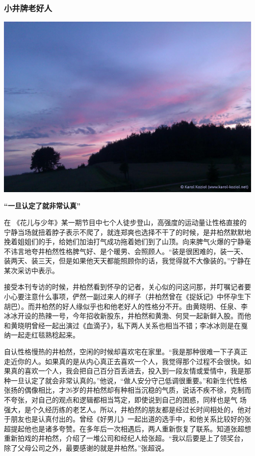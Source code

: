 \documentclass[12pt]{ctexart}
\begin{document}
\subsubsection*{小井牌老好人}
\rightboxbegin

\includegraphics[width=1\textwidth]{sky.jpg}

\rightboxend
\textbf{“一旦认定了就非常认真”}



在 《花儿与少年》某一期节目中七个人徒步登山，高强度的运动量让性格直接的宁静当场就扭着脖子表示不爬了，就连郑爽也选择不干了的时候，是井柏然默默地挽着姐姐们的手，给她们加油打气成功拖着她们到了山顶。向来脾气火爆的宁静毫不讳言地夸井柏然性格脾气好、是个暖男、会照顾人。“装是很困难的，装一天、装两天、装三天，但是如果他天天都能照顾你的话，我觉得就不大像装的。”宁静在某次采访中表示。

接受本刊专访的时候，井柏然看到怀孕的记者，关心似的问这问那，并叮嘱记者要小心要注意什么事项，俨然一副过来人的样子（井柏然曾在《捉妖记》中怀孕生下胡巴）。而井柏然的好人缘似乎也和他老好人的性格分不开。由黄晓明、任泉、李冰冰开设的热辣一号，今年招收新股东，井柏然和黄渤、何炅一起新鲜入股。而他和黄晓明曾经一起出演过《血滴子》，私下两人关系也相当不错；李冰冰则是在戛纳一起走红毯熟稔起来。

自认性格慢热的井柏然，空闲的时候却喜欢宅在家里。“我是那种很难一下子真正走近你的人。如果真的是从内心真正去喜欢一个人，我觉得那个过程不会很快。如果真的喜欢一个人，我会把自己百分百丢进去，投入到一段友情或爱情中，我是那种一旦认定了就会非常认真的。”他说，“做人安分守己低调很重要。”和新生代性格张扬的偶像相比，才26岁的井柏然却有种相当沉稳的气质，说话不疾不徐，克制而不夸张，对自己的观点和逻辑都相当笃定，即使说到自己的困惑，同样也是气 场强大，是个久经历练的老艺人。所以，井柏然的朋友都是经过长时间相处的，他对于朋友也是认真付出的。曾经《好男儿》一起出道的选手中，和他关系比较好的张超提起他也是诸多夸赞。在多年后一次相遇后，两人重新恢复了联系。知道张超想重新拍戏的井柏然，介绍了一堆公司和经纪人给张超。“我以后要是上了领奖台，除了父母公司之外，最要感谢的就是井柏然。”张超说。
\end{document}
